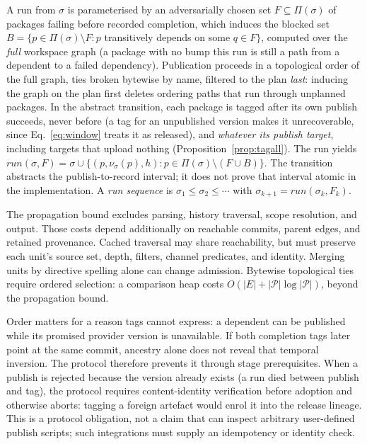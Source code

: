 \begin{definition}[run]
\label{def:run}
A run from $\sigma$ is parameterised by an adversarially chosen set
$F \subseteq \Pi(\sigma)$ of packages failing before recorded completion, which induces the
blocked set
$B = \{p \in \Pi(\sigma) \setminus F : p$ transitively depends on some
$q \in F\}$, computed over the \emph{full} workspace graph (a package
with no bump this run is still a path from a dependent to a failed
dependency). Publication proceeds in a topological order of the full
graph, ties broken bytewise by name, filtered to the plan \emph{last}:
inducing the graph on the plan first deletes ordering paths that run
through unplanned packages. In the abstract transition, each package is tagged after its
own publish succeeds, never before (a tag for an unpublished version
makes it unrecoverable, since Eq.~\ref{eq:window} treats it as
released), and \emph{whatever its publish target},
including targets that upload nothing
(Proposition~\ref{prop:tagall}). The run yields
$\mathit{run}(\sigma,F) = \sigma \cup \{(p, \nu_\sigma(p), h) : p \in
\Pi(\sigma) \setminus (F \cup B)\}$. The transition abstracts the publish-to-record interval; it does not
prove that interval atomic in the implementation. A \emph{run sequence} is
$\sigma_1 \leq \sigma_2 \leq \cdots$ with $\sigma_{k+1} =
\mathit{run}(\sigma_k, F_k)$.
\end{definition}

The propagation bound excludes parsing, history traversal, scope resolution,
and output. Those costs depend additionally on reachable commits, parent
edges, and retained provenance. Cached traversal may share reachability, but
must preserve each unit's source set, depth, filters, channel predicates, and
identity. Merging units by directive spelling alone can change admission.
Bytewise topological ties require ordered selection: a comparison heap costs
$O(|E|+|\mathcal{P}|\log|\mathcal{P}|)$, beyond the propagation bound.

Order matters for a reason tags cannot express: a dependent can be published
while its promised provider version is unavailable. If both completion tags
later point at the same commit, ancestry alone does not reveal that temporal
inversion. The protocol therefore prevents it through stage prerequisites. When a
publish is rejected because the version already exists (a run died
between publish and tag), the protocol requires content-identity verification
before adoption and otherwise aborts: tagging a foreign artefact would enrol
it into the release lineage. This is a protocol obligation, not a claim that
\tool{} can inspect arbitrary user-defined publish scripts; such integrations
must supply an idempotency or identity check.

